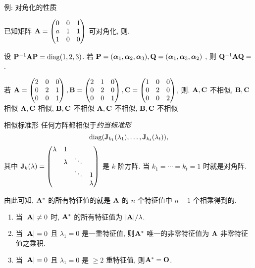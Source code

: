 \begin{frame}{例: 对角化的性质}\small
\beqskip{5pt}
	\onslide<+->
	\begin{exercise}
		已知矩阵 ${\mathbf{A}}=\begin{pmatrix}
			0&0&1\\
			a&1&1\\
			1&0&0
		\end{pmatrix}$ 可对角化, 则.
	\end{exercise}
	\onslide<+->
	\begin{exercise}
		设 ${\mathbf{P}}^{-1}{\mathbf{A}}{\mathbf{P}}={\mathrm{diag}}(1,2,3)$.
		若 ${\mathbf{P}}=({\boldsymbol{\alpha}}_1,{\boldsymbol{\alpha}}_2,{\boldsymbol{\alpha}}_3),{\mathbf{Q}}=({\boldsymbol{\alpha}}_1,{\boldsymbol{\alpha}}_3,{\boldsymbol{\alpha}}_2)$	, 则 ${\mathbf{Q}}^{-1}{\mathbf{A}}{\mathbf{Q}}=$\fillblank[2cm]{\visible<+->{$\diag(1,3,2)$}}.
	\end{exercise}
	\onslide<+->
	\begin{exercise}
		若 ${\mathbf{A}}=\begin{pmatrix}
			2&0&0\\
			0&2&1\\
			0&0&1
		\end{pmatrix},{\mathbf{B}}=\begin{pmatrix}
			2&1&0\\
			0&2&0\\
			0&0&1
		\end{pmatrix},{\mathbf{C}}=\begin{pmatrix}
			1&0&0\\
			0&2&0\\
			0&0&2
		\end{pmatrix}$, 则\fillbrace{\visible<+->{C}}.
		\xx{$\bfA,\bfC$ 相似, $\bfB,\bfC$ 相似}%
		{$\bfA,\bfC$ 不相似, $\bfB,\bfC$ 相似}%
		{$\bfA,\bfC$ 相似, $\bfB,\bfC$ 不相似}%
		{$\bfA,\bfC$ 不相似, $\bfB,\bfC$ 不相似}
	\end{exercise}
\endgroup
\end{frame}


\begin{frame}{相似标准形\noexer}
	\onslide<+->
	任何方阵都相似于\emph{约当标准形}
	\[{\mathrm{diag}}({\mathbf{J}}_{k_1}(\lambda_1),\dots,{\mathbf{J}}_{k_t}(\lambda_t)),\]
	其中 ${\mathbf{J}}_k(\lambda)=\begin{pmatrix}
		\lambda&1&&\\
		&\lambda&\ddots&\\
		&&\ddots&1\\
		&&&\lambda
	\end{pmatrix}$ 是 $k$ 阶方阵.
	\onslide<+->
	当 $k_1=\cdots=k_t=1$ 时就是对角阵.

	\onslide<+->
	由此可知, \alert{${\mathbf{A}}^*$ 的所有特征值的就是 ${\mathbf{A}}$ 的 $n$ 个特征值中 $n-1$ 个相乘得到的}.
	\begin{enumerate}
		\item 当 $|{\mathbf{A}}|\neq0$ 时, ${\mathbf{A}}^*$ 的所有特征值为 $|{\mathbf{A}}|/\lambda$.
		\item 当 $|{\mathbf{A}}|=0$ 且 $\lambda_1=0$ 是一重特征值, 则${\mathbf{A}}^*$ 唯一的非零特征值为 ${\mathbf{A}}$ 非零特征值之乘积.
		\item 当 $|{\mathbf{A}}|=0$ 且 $\lambda_1=0$ 是 $\ge2$ 重特征值, 则${\mathbf{A}}^*={\mathbf{O}}$.
	\end{enumerate}
\end{frame}


